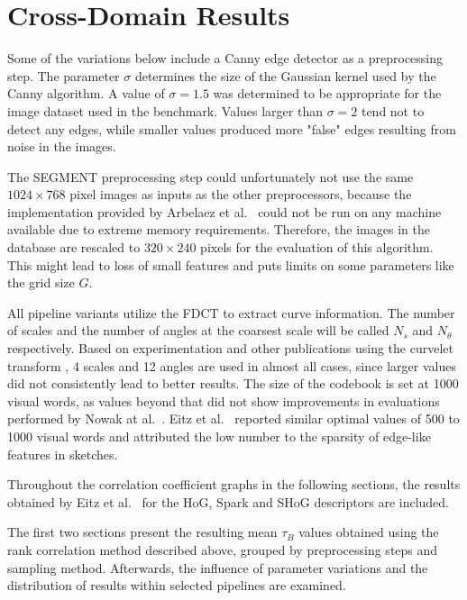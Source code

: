 \section{Cross-Domain Results}\label{sec:cross_results}

Some of the variations below include a Canny edge detector as a preprocessing
step. The parameter $\sigma$ determines the size of the Gaussian kernel used by
the Canny algorithm. A value of $\sigma = 1.5$ was determined to be appropriate
for the image dataset used in the benchmark. Values larger than $\sigma = 2$
tend not to detect any edges, while smaller values produced more "false" edges
resulting from noise in the images.

The SEGMENT preprocessing step could unfortunately not use the same $1024
\times 768$ pixel images as inputs as the other preprocessors, because the
implementation provided by Arbelaez et al.\ \autocite{arbelaez_contour_2011}
could not be run on any machine available due to extreme memory requirements.
Therefore, the images in the database are rescaled to $320 \times 240$ pixels
for the evaluation of this algorithm. This might lead to loss of small features
    and puts limits on some parameters like the grid size $G$.

All pipeline variants utilize the FDCT to extract curve information. The number
of scales and the number of angles at the coarsest scale will be called $N_s$
and $N_{\theta}$ respectively. Based on experimentation and other publications
using the curvelet transform \autocite{mandal_curvelet_2009}
\autocite{guha_curvelet_2010}, 4 scales and 12 angles are used in almost all
cases, since larger values did not consistently lead to better results. The
size of the codebook is set at 1000 visual words, as values beyond that did
not show improvements in evaluations performed by Nowak at al.\
\autocite{nowak_sampling_2006}. Eitz et al.\ \autocite{eitz_sketch-based_2011}
reported similar optimal values of 500 to 1000 visual words and attributed the
low number to the sparsity of edge-like features in sketches.

Throughout the correlation coefficient graphs in the following sections, the
results obtained by Eitz et al.\ \autocite{eitz_sketch-based_2011} for the HoG,
Spark and SHoG descriptors are included.

The first two sections present the resulting mean $\tau_B$ values obtained
using the rank correlation method described above, grouped by preprocessing
steps and sampling method. Afterwards, the influence of parameter variations
and the distribution of results within selected pipelines are examined.






